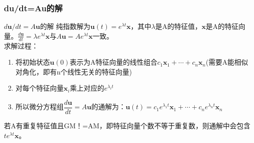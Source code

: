    \subsubsection{du/dt=Au的解}
    $d \boldsymbol{u} / d t=A \boldsymbol{u}$的解
    纯指数解为$\boldsymbol{u}(t)=e^{\lambda t} \boldsymbol{x}$，其中$\lambda$是A的特征值，$\bm{x}$是A的特征向量。$\frac{d \boldsymbol{u}}{d t}=\lambda e^{\lambda t} \boldsymbol{x}$与$A \boldsymbol{u}=A e^{\lambda t} \boldsymbol{x}$一致。
    \\
    求解过程：
    \begin{enumerate}
        \item 将初始状态$\boldsymbol{u}(0)$表示为A特征向量的线性组合$c_{1} \boldsymbol{x}_{1}+\cdots+c_{n} \boldsymbol{x}_{n}$(需要A能相似对角化，即有n个线性无关的特征向量)
        \item 对每个特征向量$\boldsymbol{x}_{i}$乘上对应的$e^{\lambda_{i} t}$
        \item 所以微分方程组$\dfrac{d \bm{u}}{d t}=A \bm{u}$的通解为：$\bm{u}(t)=c_{1} e^{\lambda_{1} t} \bm{x}_{1}+\cdots+c_{n} e^{\lambda_{n} t} \bm{x}_{n}$
    \end{enumerate}
    若A有重复特征值且GM！=AM，即特征向量个数不等于重复数，则通解中会包含$t e^{\lambda t} \boldsymbol{x}$。

